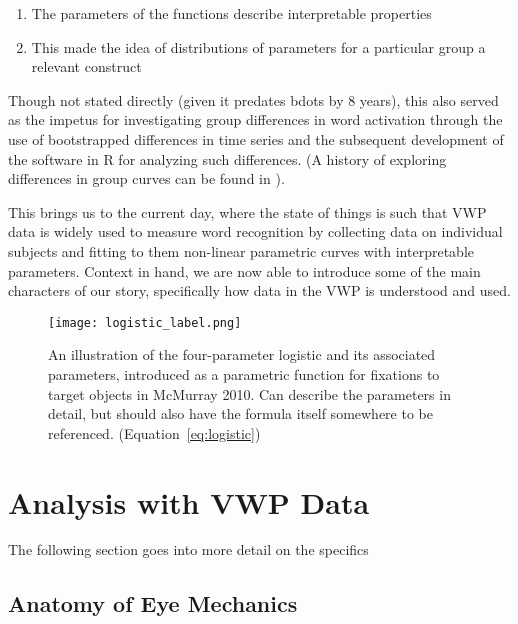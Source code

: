 \begin{singlespace}
\begin{enumerate}
\vspace{-3mm}
\item The parameters of the functions describe interpretable properties
\item This made the idea of distributions of parameters for a particular group a relevant construct
\end{enumerate}
\end{singlespace}

Though not stated directly (given it predates bdots by 8 years), this also served as the impetus for investigating group differences in word activation through the use of bootstrapped differences in time series \cite{oleson2017detecting} and the subsequent development of the  software in R for analyzing such differences. (A history of exploring differences in group curves can be found in \cite{seedorff2018bdots}).

This brings us to the current day, where the state of things is such that VWP data is widely used to measure word recognition by collecting data on individual subjects and fitting to them non-linear parametric curves with interpretable parameters. Context in hand, we are now able to introduce some of the main characters of our story, specifically how data in the VWP is understood and used. 



\begin{figure}[h]
\centering
\texttt{[image: logistic\_label.png]}
\caption{An illustration of the four-parameter logistic and its associated parameters, introduced as a parametric function for fixations to target objects in McMurray 2010. Can describe the parameters in detail, but should also have the formula itself somewhere to be referenced. (Equation~\ref{eq:logistic})}
\label{fig:logistic_definition}
\end{figure}



\section{Analysis with VWP Data}

The following section goes into more detail on the specifics


\subsection{Anatomy of Eye Mechanics }

